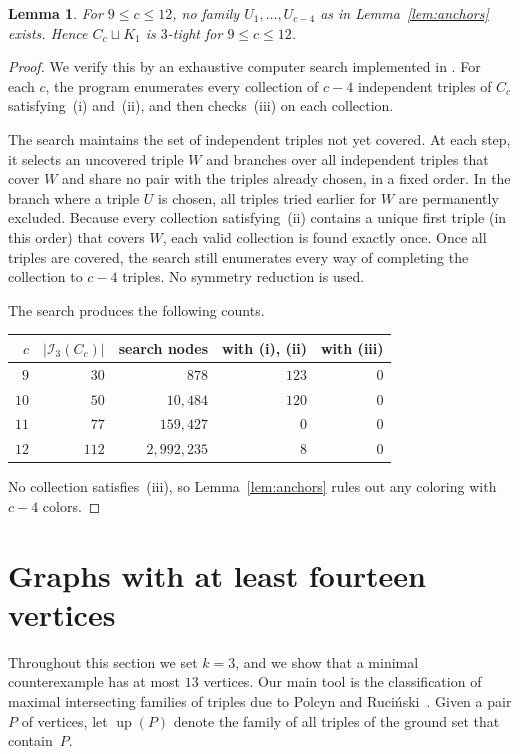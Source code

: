 \documentclass[11pt]{amsart}
\newtheorem{lemma}[theorem]{Lemma}
\theoremstyle{definition}
\theoremstyle{remark}
\numberwithin{equation}{section}
\newcommand{\up}{\operatorname{up}}
\begin{document}
\begin{lemma}\label{lem:isolate}
For $9\le c\le12$, no family $U_1,\dots,U_{c-4}$ as in
Lemma~\ref{lem:anchors} exists. Hence $C_c\sqcup K_1$ is $3$-tight for
$9\le c\le12$.
\end{lemma}

\begin{proof}
We verify this by an exhaustive computer search implemented in
. For each $c$, the program enumerates every
collection of $c-4$ independent triples of $C_c$ satisfying~(i) and~(ii), and
then checks~(iii) on each collection.

The search maintains the set of independent triples not yet covered. At each
step, it selects an uncovered triple $W$ and branches over all independent
triples that cover $W$ and share no pair with the triples already chosen, in a
fixed order. In the branch where a triple $U$ is chosen, all triples tried
earlier for $W$ are permanently excluded. Because every collection
satisfying~(ii) contains a unique first triple (in this order) that covers $W$,
each valid collection is found exactly once. Once all triples are covered, the
search still enumerates every way of completing the collection to $c-4$
triples. No symmetry reduction is used.

The search produces the following counts.
\begin{center}
\begin{tabular}{rrrrr}
\toprule
$c$ & $|\mathcal I_3(C_c)|$ & search nodes & with (i), (ii) & with (iii)\\
\midrule
$9$ & $30$ & $878$ & $123$ & $0$\\
$10$ & $50$ & $10{,}484$ & $120$ & $0$\\
$11$ & $77$ & $159{,}427$ & $0$ & $0$\\
$12$ & $112$ & $2{,}992{,}235$ & $8$ & $0$\\
\bottomrule
\end{tabular}
\end{center}
No collection satisfies~(iii), so Lemma~\ref{lem:anchors} rules out any
coloring with $c-4$ colors.
\end{proof}

\section{Graphs with at least fourteen vertices}\label{sec:large}

Throughout this section we set $k=3$, and we show that a minimal counterexample
has at most $13$ vertices. Our main tool is the classification of maximal
intersecting families of triples due to Polcyn and Ruci\'nski~\cite{PR}. Given
a pair $P$ of vertices, let $\up(P)$ denote the family of all triples of the
ground set that contain~$P$.
\end{document}
